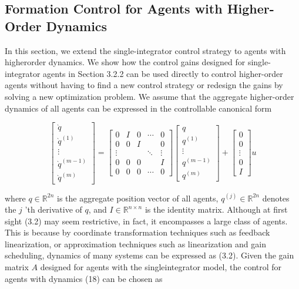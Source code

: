 \documentclass[10pt]{article}
\begin{document}
\subsection{Formation Control for Agents with Higher-Order Dynamics}
In this section, we extend the single-integrator control strategy to agents with higherorder dynamics. We show how the control gains designed for single-integrator agents in Section 3.2.2 can be used directly to control higher-order agents without having to find a new control strategy or redesign the gains by solving a new optimization problem. We assume that the aggregate higher-order dynamics of all agents can be expressed in the controllable canonical form

$$
\left[\begin{array}{c}
\grave{q} \\
\grave{q}^{(1)} \\
\vdots \\
\grave{q}^{(m-1)} \\
\grave{q}^{(m)}
\end{array}\right]=\left[\begin{array}{ccccc}
0 & I & 0 & \cdots & 0 \\
0 & 0 & I & & 0 \\
\vdots & & & \ddots & \vdots \\
0 & 0 & 0 & & I \\
0 & 0 & 0 & \cdots & 0
\end{array}\right]\left[\begin{array}{c}
q \\
q^{(1)} \\
\vdots \\
q^{(m-1)} \\
q^{(m)}
\end{array}\right]+\left[\begin{array}{c}
0 \\
0 \\
\vdots \\
0 \\
I
\end{array}\right] u
$$

where $q \in \mathbb{R}^{2 n}$ is the aggregate position vector of all agents, $q^{(j)} \in \mathbb{R}^{2 n}$ denotes the $j$ 'th derivative of $q$, and $I \in \mathbb{R}^{n \times n}$ is the identity matrix. Although at first sight (3.2) may seem restrictive, in fact, it encompasses a large class of agents. This is because by coordinate transformation techniques such as feedback linearization, or approximation techniques such as linearization and gain scheduling, dynamics of many systems can be expressed as (3.2). Given the gain matrix $A$ designed for agents with the singleintegrator model, the control for agents with dynamics (18) can be chosen as
\end{document}
